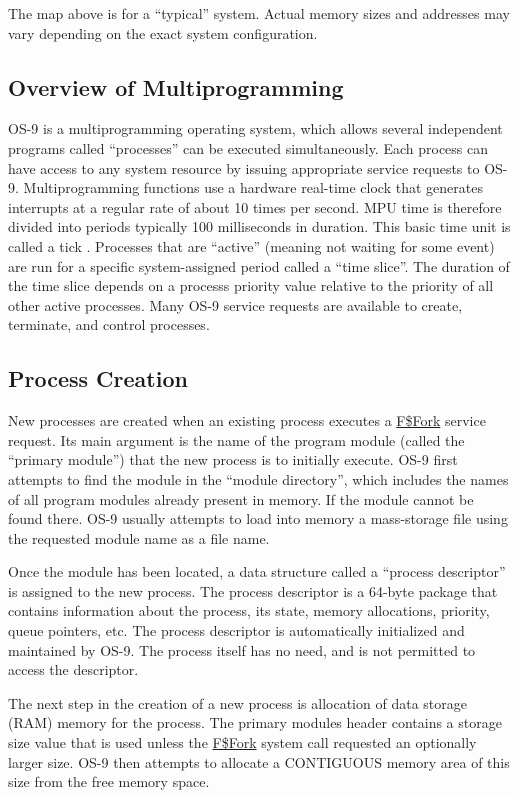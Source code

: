 \documentclass[
]{article}
\begin{document}
The map above is for a ``typical'' system. Actual memory sizes and
addresses may vary depending on the exact system configuration.

\subsection{Overview of Multiprogramming}

OS-9 is a multiprogramming operating system, which allows several
independent programs called ``processes'' can be executed
simultaneously. Each process can have access to any system resource by
issuing appropriate service requests to OS-9. Multiprogramming functions
use a hardware real-time clock that generates interrupts at a regular
rate of about 10 times per second. MPU time is therefore divided into
periods typically 100 milliseconds in duration. This basic time unit is
called a tick . Processes that are ``active'' (meaning not waiting for
some event) are run for a specific system-assigned period called a
``time slice''. The duration of the time slice depends on a
process\textquotesingle s priority value relative to the priority of all
other active processes. Many OS-9 service requests are available to
create, terminate, and control processes.

\subsection{Process Creation}

New processes are created when an existing process executes a
\hyperref[f.fork]{F\$Fork} service request. Its main argument is the
name of the program module (called the ``primary module'') that the new
process is to initially execute. OS-9 first attempts to find the module
in the ``module directory'', which includes the names of all program
modules already present in memory. If the module cannot be found there.
OS-9 usually attempts to load into memory a mass-storage file using the
requested module name as a file name.

Once the module has been located, a data structure called a ``process
descriptor'' is assigned to the new process. The process descriptor is a
64-byte package that contains information about the process, its state,
memory allocations, priority, queue pointers, etc. The process
descriptor is automatically initialized and maintained by OS-9. The
process itself has no need, and is not permitted to access the
descriptor.

The next step in the creation of a new process is allocation of data
storage (RAM) memory for the process. The primary
module\textquotesingle s header contains a storage size value that is
used unless the \hyperref[f.fork]{F\$Fork} system call requested an
optionally larger size. OS-9 then attempts to allocate a CONTIGUOUS
memory area of this size from the free memory space.
\end{document}
